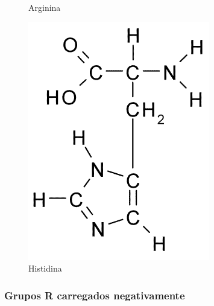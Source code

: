 \documentclass[a4paper,12pt]{article}
\begin{document}
\begin{figure}[H]
\begin{center}
\begin{minipage}{0.3\linewidth}
	 			\caption{Arginina}
	 			\label{fig:arginine}
	 		\end{minipage}
	 		\begin{minipage}{0.3\linewidth}
	 			\centering   
	 			\includegraphics[width=0.7\linewidth]{histidine.png}
	 			\caption{Histidina}
	 			\label{fig:histidine}
	 		\end{minipage}
	 	\end{center}
	 \end{figure}
 
 	\subsubsection*{Grupos R carregados negativamente}
 	
\end{document}
